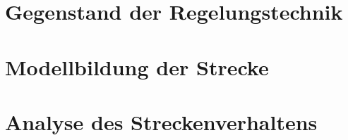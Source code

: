 \documentclass{LxUm}
\begin{document}
 
\singlespacing

\pagestyle{fancy}

\sffamily



\chapter{Gegenstand der Regelungstechnik} 
\chapter{Modellbildung der Strecke} 
\chapter{Analyse des Streckenverhaltens} 

\end{document}
